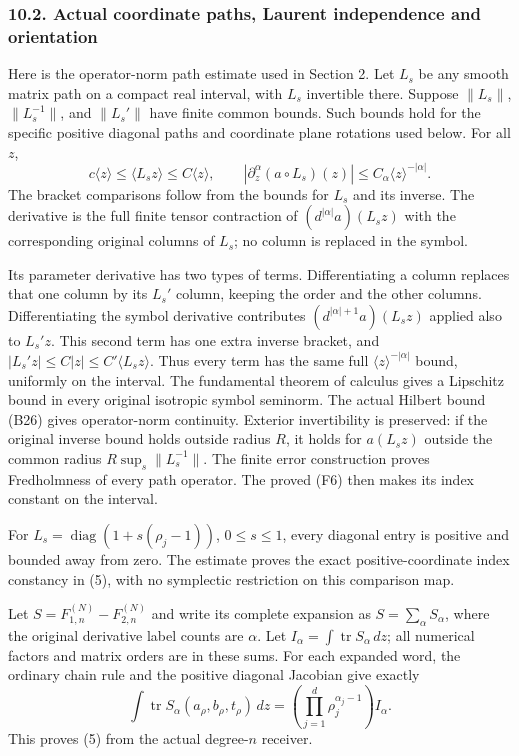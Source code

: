 \documentclass[
  11pt,
]{article}
\begin{document}
\subsubsection{10.2. Actual coordinate paths, Laurent independence and
orientation}\label{actual-coordinate-paths-laurent-independence-and-orientation}

Here is the operator-norm path estimate used in Section 2. Let \(L_s\)
be any smooth matrix path on a compact real interval, with \(L_s\)
invertible there. Suppose \(\|L_s\|\), \(\|L_s^{-1}\|\), and
\(\|L_s'\|\) have finite common bounds. Such bounds hold for the
specific positive diagonal paths and coordinate plane rotations used
below. For all \(z\), \[
c\langle z\rangle\leq\langle L_sz\rangle
             \leq C\langle z\rangle,\qquad
|\partial_z^\alpha(a\circ L_s)(z)|
             \leq C_\alpha\langle z\rangle^{-|\alpha|}.
\tag{OE7}
\] The bracket comparisons follow from the bounds for \(L_s\) and its
inverse. The derivative is the full finite tensor contraction of
\((d^{|\alpha|}a)(L_sz)\) with the corresponding original columns of
\(L_s\); no column is replaced in the symbol.

Its parameter derivative has two types of terms. Differentiating a
column replaces that one column by its \(L_s'\) column, keeping the
order and the other columns. Differentiating the symbol derivative
contributes \((d^{|\alpha|+1}a)(L_sz)\) applied also to \(L_s'z\). This
second term has one extra inverse bracket, and
\(|L_s'z|\leq C|z|\leq C'\langle L_sz\rangle\). Thus every term has the
same full \(\langle z\rangle^{-|\alpha|}\) bound, uniformly on the
interval. The fundamental theorem of calculus gives a Lipschitz bound in
every original isotropic symbol seminorm. The actual Hilbert bound (B26)
gives operator-norm continuity. Exterior invertibility is preserved: if
the original inverse bound holds outside radius \(R\), it holds for
\(a(L_sz)\) outside the common radius \(R\sup_s\|L_s^{-1}\|\). The
finite error construction proves Fredholmness of every path operator.
The proved (F6) then makes its index constant on the interval.

For \(L_s=\operatorname{diag}(1+s(\rho_j-1))\), \(0\leq s\leq1\), every
diagonal entry is positive and bounded away from zero. The estimate
proves the exact positive-coordinate index constancy in (5), with no
symplectic restriction on this comparison map.

Let \(S=F_{1,n}^{(N)}-F_{2,n}^{(N)}\) and write its complete expansion
as \(S=\sum_\alpha S_\alpha\), where the original derivative label
counts are \(\alpha\). Let
\(I_\alpha=\int\operatorname{tr}S_\alpha\,dz\); all numerical factors
and matrix orders are in these sums. For each expanded word, the
ordinary chain rule and the positive diagonal Jacobian give exactly \[
\int\operatorname{tr}S_\alpha(a_\rho,b_\rho,t_\rho)\,dz
 =\left(\prod_{j=1}^{d}\rho_j^{\alpha_j-1}\right)I_\alpha.
\tag{OE8}
\] This proves (5) from the actual degree-\(n\) receiver.
\end{document}
